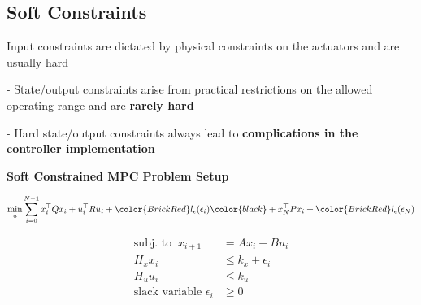 


\subsection{Soft Constraints}

Input constraints are dictated by physical constraints on
the actuators and are usually hard

- State/output constraints arise from practical restrictions
on the allowed operating range and are \textbf{rarely hard}

- Hard state/output constraints always lead to
\textbf{complications in the controller implementation}

\begin{sstTitleBox}[ForestGreen]{\center\textbf{\large
			Soft Constrained MPC Problem Setup
		}
	}


	\begin{adjustbox}{rndcorners=0.5mm}
		\begin{sstOnlyFrame}[ForestGreen]
			\[
				\min_u\sum_{i=0}^{N-1}
				x_i^\top Q x_i + u_i^\top R u_i
				+\color{BrickRed}l_\epsilon(\epsilon_i)\color{black}
				+x_N^\top P x_i
				+\color{BrickRed}l_\epsilon(\epsilon_N)
			\]
		\end{sstOnlyFrame}
	\end{adjustbox}
	\[\begin{aligned}
			\text{subj.\ to }\   x_{i+1}      & = Ax_i + Bu_i      \\
			H_xx_i                            & \le k_x+\epsilon_i \\
			H_uu_i                            & \le k_u            \\
			\text{slack variable }	\epsilon_i & \ge0
		\end{aligned}\]

\end{sstTitleBox}

